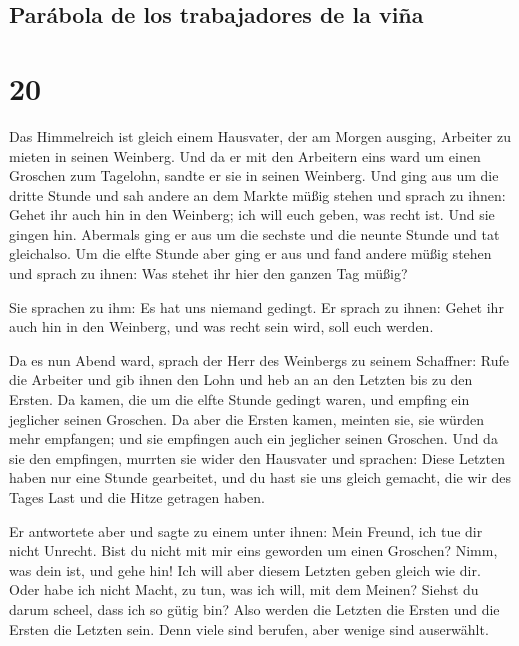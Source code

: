 \hypertarget{paruxe1bola-de-los-trabajadores-de-la-viuxf1a}{%
\subsection{Parábola de los trabajadores de la
viña}\label{paruxe1bola-de-los-trabajadores-de-la-viuxf1a}}

\hypertarget{section-19}{%
\section{20}\label{section-19}}

 Das Himmelreich ist gleich einem Hausvater, der am Morgen
ausging, Arbeiter zu mieten in seinen Weinberg.  Und da er
mit den Arbeitern eins ward um einen Groschen zum Tagelohn, sandte er
sie in seinen Weinberg.  Und ging aus um die dritte Stunde
und sah andere an dem Markte müßig stehen  und sprach zu
ihnen: Gehet ihr auch hin in den Weinberg; ich will euch geben, was
recht ist.  Und sie gingen hin. Abermals ging er aus um
die sechste und die neunte Stunde und tat gleichalso.  Um
die elfte Stunde aber ging er aus und fand andere müßig stehen und
sprach zu ihnen: Was stehet ihr hier den ganzen Tag müßig?

 Sie sprachen zu ihm: Es hat uns niemand gedingt. Er
sprach zu ihnen: Gehet ihr auch hin in den Weinberg, und was recht sein
wird, soll euch werden.

 Da es nun Abend ward, sprach der Herr des Weinbergs zu
seinem Schaffner: Rufe die Arbeiter und gib ihnen den Lohn und heb an an
den Letzten bis zu den Ersten.  Da kamen, die um die elfte
Stunde gedingt waren, und empfing ein jeglicher seinen Groschen.
 Da aber die Ersten kamen, meinten sie, sie würden mehr
empfangen; und sie empfingen auch ein jeglicher seinen Groschen.
 Und da sie den empfingen, murrten sie wider den
Hausvater  und sprachen: Diese Letzten haben nur eine
Stunde gearbeitet, und du hast sie uns gleich gemacht, die wir des Tages
Last und die Hitze getragen haben.

 Er antwortete aber und sagte zu einem unter ihnen: Mein
Freund, ich tue dir nicht Unrecht. Bist du nicht mit mir eins geworden
um einen Groschen?  Nimm, was dein ist, und gehe hin! Ich
will aber diesem Letzten geben gleich wie dir.  Oder habe
ich nicht Macht, zu tun, was ich will, mit dem Meinen? Siehst du darum
scheel, dass ich so gütig bin?  Also werden die Letzten
die Ersten und die Ersten die Letzten sein. Denn viele sind berufen,
aber wenige sind auserwählt.

